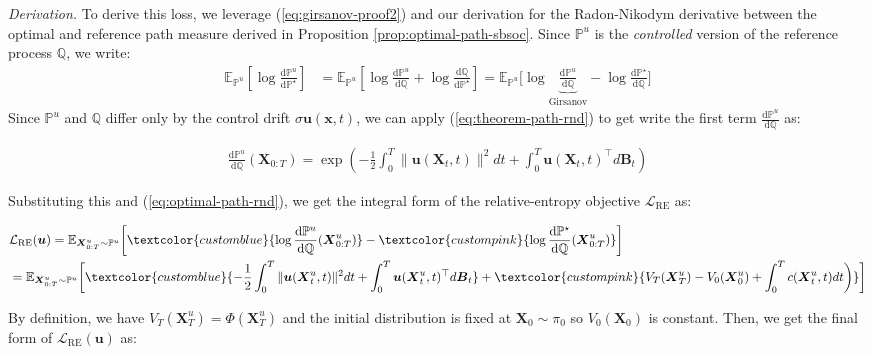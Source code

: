 \documentclass{article}
\newcommand{\bluetext}[1]{\textcolor{customblue}{#1}}
\newcommand{\pinktext}[1]{\textcolor{custompink}{#1}}
\begin{document}
\textit{Derivation.} To derive this loss, we leverage (\ref{eq:girsanov-proof2}) and our derivation for the Radon-Nikodym derivative between the optimal and reference path measure derived in Proposition \ref{prop:optimal-path-sbsoc}. Since $\mathbb{P}^u$ is the \textit{controlled} version of the reference process $\mathbb{Q}$, we write:
\begin{align}
    \mathbb{E}_{\mathbb{P}^u}\left[\log \frac{\mathrm{d}\mathbb{P}^u}{\mathrm{d}\mathbb{P}^\star}\right]&=\mathbb{E}_{\mathbb{P}^u}\left[\log \frac{\mathrm{d}\mathbb{P}^u}{\mathrm{d}\mathbb{Q}}+\log \frac{\mathrm{d}\mathbb{Q}}{\mathrm{d}\mathbb{P}^\star}\right]=\mathbb{E}_{\mathbb{P}^u}\bigg[\log \underbrace{\frac{\mathrm{d}\mathbb{P}^u}{\mathrm{d}\mathbb{Q}}}_{\text{Girsanov}}-\log \frac{\mathrm{d}\mathbb{P}^\star}{\mathrm{d}\mathbb{Q}}\bigg]
\end{align}
Since $\mathbb{P}^u$ and $\mathbb{Q}$ differ only by the control drift $\sigma\boldsymbol{u}(\boldsymbol{x},t)$, we can apply (\ref{eq:theorem-path-rnd}) to get write the first term $\frac{\mathrm{d}\mathbb{P}^u}{\mathrm{d}\mathbb{Q}}$ as:
\begin{small}
    \begin{align}
        \frac{\mathrm{d}\mathbb{P}^u}{\mathrm{d}\mathbb{Q}}(\boldsymbol{X}_{0:T})=\exp\left(-\frac{1}{2}\int_0^T\|\boldsymbol{u}(\boldsymbol{X}_t,t)\|^2dt+\int_0^T\boldsymbol{u}(\boldsymbol{X}_t,t)^\top d\boldsymbol{B}_t\right)
    \end{align}
\end{small}
Substituting this and (\ref{eq:optimal-path-rnd}), we get the integral form of the relative-entropy objective $\mathcal{L}_{\text{RE}}$ as:
\begin{small}
\begin{align}
    &\mathcal{L}_{\text{RE}}(\boldsymbol{u})=\mathbb{E}_{\boldsymbol{X}^u_{0:T}\sim \mathbb{P}^u}\bigg[ \bluetext{\log \frac{\mathrm{d}\mathbb{P}^u}{\mathrm{d}\mathbb{Q}}(\boldsymbol{X}^u_{0:T})}- \pinktext{\log \frac{\mathrm{d}\mathbb{P}^\star}{\mathrm{d}\mathbb{Q}}(\boldsymbol{X}^u_{0:T})}\bigg]\nonumber\\
    &=\mathbb{E}_{\boldsymbol{X}^u_{0:T}\sim \mathbb{P}^u}\bigg[ \bluetext{-\frac{1}{2}\int_0^T\|\boldsymbol{u}(\boldsymbol{X}^u_t,t)\|^2dt+\int_0^T\boldsymbol{u}(\boldsymbol{X}^u_t,t)^\top d\boldsymbol{B}_t}+\pinktext{V_T(\boldsymbol{X}^u_T)-V_0(\boldsymbol{X}^u_0)+\int_0^Tc(\boldsymbol{X}^u_t,t)dt\bigg)}\bigg]
\end{align}
\end{small}
By definition, we have $V_T(\boldsymbol{X}^u_T)=\Phi(\boldsymbol{X}^u_T)$ and the initial distribution is fixed at $\boldsymbol{X}_0\sim\pi_0$ so $V_0(\boldsymbol{X}_0)$ is constant. Then, we get the final form of $\mathcal{L}_{\text{RE}}(\boldsymbol{u})$ as:
\end{document}
